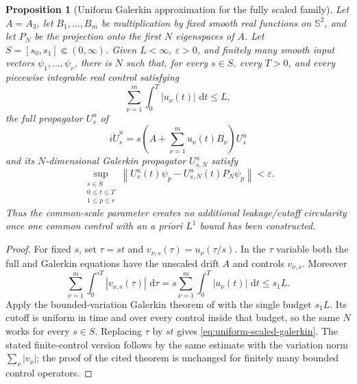\documentclass[11pt]{article}
\newtheorem{proposition}[theorem]{Proposition}
\theoremstyle{remark}
\newcommand{\dd}{\,\mathrm d}
\begin{document}
\begin{proposition}[Uniform Galerkin approximation for the fully scaled family]
\label{prop:uniform-scaled-galerkin}
Let $A=A_3$, let $B_1,\ldots,B_m$ be multiplication by fixed smooth real
functions on $\mathbb S^2$, and let $P_N$ be the projection onto the first
$N$ eigenspaces of $A$.  Let $S=[s_0,s_1]\Subset(0,\infty)$.  Given
$L<\infty$, $\varepsilon>0$, and finitely many smooth input vectors
$\psi_1,\ldots,\psi_r$, there is $N$ such that, for every $s\in S$, every
$T>0$, and every piecewise integrable real control satisfying
\[
 \sum_{\nu=1}^m\int_0^T|u_\nu(t)|\,\dd t\leq L,
\]
the full propagator $U_s^u$ of
\[
 i\dot U_s^u
 =s\left(A+\sum_{\nu=1}^mu_\nu(t)B_\nu\right)U_s^u
\]
and its $N$-dimensional Galerkin propagator $U_{s,N}^u$ satisfy
\begin{equation}
 \sup_{\substack{s\in S\\0\leq t\leq T\\1\leq p\leq r}}
 \left\|
  U_s^u(t)\psi_p-U_{s,N}^u(t)P_N\psi_p
 \right\|<\varepsilon.
 \label{eq:uniform-scaled-galerkin}
\end{equation}
Thus the common-scale parameter creates no additional leakage/cutoff
circularity once one common control with an a priori $L^1$ bound has been
constructed.
\end{proposition}

\begin{proof}
For fixed $s$, set $\tau=st$ and
$v_{\nu,s}(\tau)=u_\nu(\tau/s)$.  In the $\tau$ variable both the full and
Galerkin equations have the unscaled drift $A$ and controls $v_{\nu,s}$.
Moreover
\[
 \sum_{\nu=1}^m\int_0^{sT}|v_{\nu,s}(\tau)|\,\dd\tau
 =s\sum_{\nu=1}^m\int_0^T|u_\nu(t)|\,\dd t
 \leq s_1L.
\]
Apply the bounded-variation Galerkin theorem of
\cite{BoussaidCaponigroChambrion2014} with the single budget $s_1L$.
Its cutoff is uniform in time and over every control inside that budget, so
the same $N$ works for every $s\in S$.  Replacing $\tau$ by $st$ gives
\eqref{eq:uniform-scaled-galerkin}.  The stated finite-control version follows
by the same estimate with the variation norm $\sum_\nu|v_\nu|$; the proof of
the cited theorem is unchanged for finitely many bounded control operators.
\end{proof}
\end{document}
